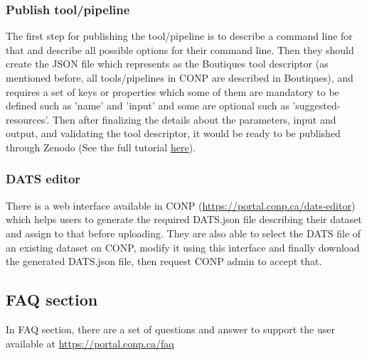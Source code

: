 \subsubsection{Publish tool/pipeline}
The first step for publishing the tool/pipeline is to describe a command line for that and describe all possible options for their command line. Then they should create the JSON file which represents as the Boutiques tool descriptor (as mentioned before, all tools/pipelines in CONP are described in Boutiques), and requires a set of keys or properties which some of them are mandatory to be defined such as 'name' and 'input' and some are optional such as 'suggested-resources'. Then after finalizing the details about the parameters, input and output, and validating the tool descriptor, it would be ready to be published through Zenodo (See the full tutorial \href{https://nbviewer.jupyter.org/github/boutiques/tutorial/blob/master/notebooks/boutiques-tutorial.ipynb}{here}).  



\subsubsection{DATS editor}
There is a web interface available in CONP (\url{https://portal.conp.ca/dats-editor}) which helps users to generate the required DATS.json file describing their dataset and assign to that before uploading. They are also able to select the DATS file of an existing dataset on CONP, modify it using this interface and finally download the generated DATS.json file, then request CONP admin to accept that. 

\subsection{FAQ section}
In FAQ section, there are a set of questions and answer to support the user available at \url{https://portal.conp.ca/faq}








